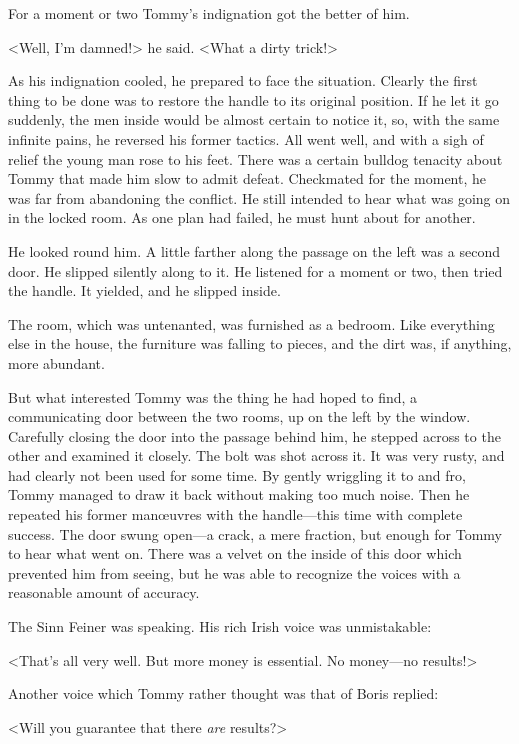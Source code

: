 For a moment or two Tommy's indignation got the better of him.

<Well, I'm damned!> he said. <What a dirty trick!>

As his indignation cooled, he prepared to face the situation. Clearly the first thing to be done was to restore the handle to its original position. If he let it go suddenly, the men inside would be almost certain to notice it, so, with the same infinite pains, he reversed his former tactics. All went well, and with a sigh of relief the young man rose to his feet. There was a certain bulldog tenacity about Tommy that made him slow to admit defeat. Checkmated for the moment, he was far from abandoning the conflict. He still intended to hear what was going on in the locked room. As one plan had failed, he must hunt about for another.

He looked round him. A little farther along the passage on the left was a second door. He slipped silently along to it. He listened for a moment or two, then tried the handle. It yielded, and he slipped inside.

The room, which was untenanted, was furnished as a bedroom. Like everything else in the house, the furniture was falling to pieces, and the dirt was, if anything, more abundant.

But what interested Tommy was the thing he had hoped to find, a communicating door between the two rooms, up on the left by the window. Carefully closing the door into the passage behind him, he stepped across to the other and examined it closely. The bolt was shot across it. It was very rusty, and had clearly not been used for some time. By gently wriggling it to and fro, Tommy managed to draw it back without making too much noise. Then he repeated his former manœuvres with the handle—this time with complete success. The door swung open—a crack, a mere fraction, but enough for Tommy to hear what went on. There was a velvet  on the inside of this door which prevented him from seeing, but he was able to recognize the voices with a reasonable amount of accuracy.

The Sinn Feiner was speaking. His rich Irish voice was unmistakable:

<That's all very well. But more money is essential. No money—no results!>

Another voice which Tommy rather thought was that of Boris replied:

<Will you guarantee that there \emph{are} results?>

